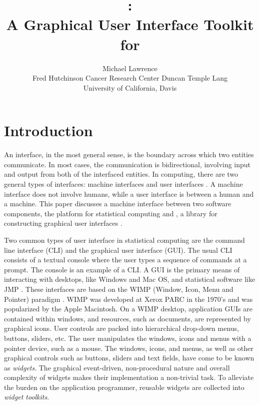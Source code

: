 \documentclass[article,shortnames]{jss}
\author{Michael Lawrence\\
Fred Hutchinson Cancer Research Center \And Duncan Temple Lang\\
University of California, Davis}
\title{\pkg{RGtk2}:\\A Graphical User Interface Toolkit for
\proglang{R}}
\begin{document}
\section{Introduction}


An interface, in the most general sense, is the boundary across which
two entities communicate. In most cases, the communication is
bidirectional, involving input and output from both of the interfaced
entities. In computing, there are two general types of interfaces:
machine interfaces and user interfaces \citep{gui-cli}. A machine
interface does not involve humans, while a user interface is between a
human and a machine. This paper discusses a machine interface between
two software components, the  platform for statistical
computing \citep{R} and , a library for constructing
graphical user interfaces \citep{GTK-library,GTK}.

Two common types of user interface in statistical computing are the
command line interface (CLI) and the graphical user interface
(GUI). The usual CLI consists of a textual console where the user
types a sequence of commands at a prompt. The  console is
an example of a CLI. A GUI is the primary means of interacting with
desktops, like Windows and Mac OS, and statistical software like JMP
\citep{JMP}. These interfaces are based on the WIMP (Window, Icon,
Menu and Pointer) paradigm \citep{WIMP}. WIMP was developed at Xerox
PARC in the 1970's and was popularized by the Apple Macintosh. On a
WIMP desktop, application GUIs are contained within windows, and
resources, such as documents, are represented by graphical icons.
User controls are packed into hierarchical drop-down menus, buttons,
sliders, etc. The user manipulates the windows, icons and menus with a
pointer device, such as a mouse.  The windows, icons, and menus, as
well as other graphical controls such as buttons, sliders and text
fields, have come to be known as \emph{widgets}. The graphical
event-driven, non-procedural nature and overall complexity of widgets
makes their implementation a non-trivial task.  To alleviate the
burden on the application programmer, reusable widgets are collected
into \emph{widget toolkits}.
\end{document}
